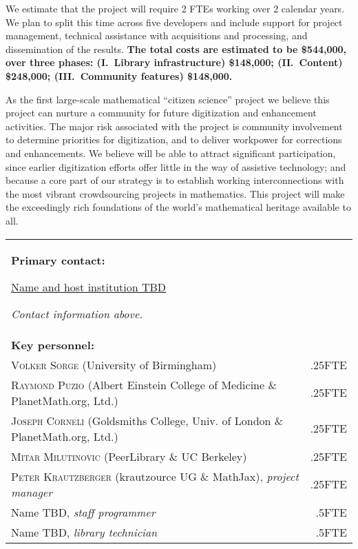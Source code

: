 \documentclass[10pt,letterpaper]{article}
\begin{document}
We estimate that the project will require 2 FTEs working
over 2 calendar years.  We plan to split this time across
five developers and include support for project management, technical
assistance with acquisitions and processing, and dissemination of the
results.  \textbf{The total costs are estimated to be \$544,000, over
  three phases: (I.~Library infrastructure) \$148,000; (II.~Content)
  \$248,000; (III.~Community features) \$148,000.}

As the first large-scale mathematical ``citizen science'' project we
believe this project can nurture a community for future digitization
and enhancement activities.  The major risk associated with the
project is community involvement to determine priorities for
digitization, and to deliver workpower for corrections and
enhancements.  We believe will be able to attract significant
participation, since earlier digitization efforts offer little in the
way of assistive technology; and because a core part of our strategy
is to establish working interconnections with the most vibrant
crowdsourcing projects in mathematics.  This project will make the
exceedingly rich foundations of the world's mathematical heritage
available to all.


\bigskip

\begin{tabular}{p{}r}
\textbf{Primary contact:} \par
\ul{Name and host institution TBD}
\par \emph{Contact information above.} &  \\[1cm]
\textbf{Key personnel:} &\\
\textsc{Volker Sorge} (University of Birmingham) &.25FTE \\
\textsc{Raymond Puzio} (Albert Einstein College of Medicine \& PlanetMath.org, Ltd.) & .25FTE \\
\textsc{Joseph Corneli} (Goldsmiths College, Univ. of London \& PlanetMath.org, Ltd.) &.25FTE \\
\textsc{Mitar Milutinovic} (PeerLibrary \& UC Berkeley)  &.25FTE \\
\textsc{Peter Krautzberger} (krautzource UG \& MathJax), \emph{project manager}&.25FTE\\
Name TBD, \emph{staff programmer}   &.5FTE \\
Name TBD, \emph{library technician}  &.5FTE \\
\end{tabular}
\end{document}
